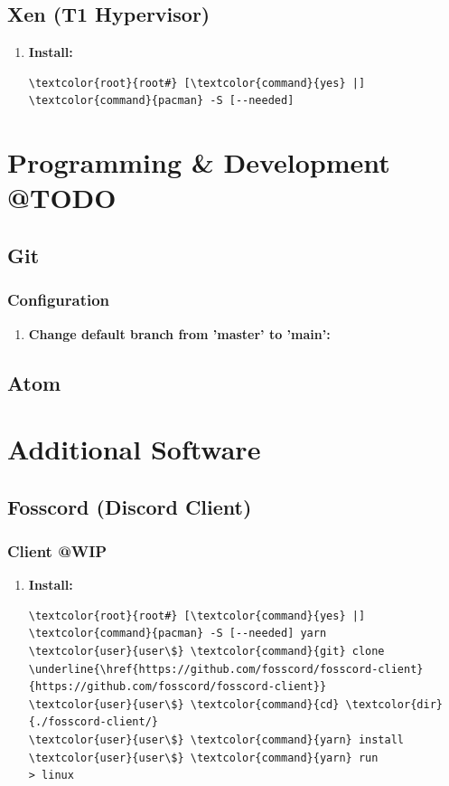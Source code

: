 \documentclass[10pt, a4paper, onecolumn, oneside, titlepage, openany]{book}
\begin{document}
\section{Xen (T1 Hypervisor)}
\begin{enumerate}
    \item \textbf{Install:}
\begin{Verbatim}[commandchars=\\\{\}]
\textcolor{root}{root#} [\textcolor{command}{yes} |] \textcolor{command}{pacman} -S [--needed] 
\end{Verbatim}
\end{enumerate}


\chapter{Programming \& Development @TODO}
\section{Git}
\subsection{Configuration}
\begin{enumerate}
    \item \textbf{Change default branch from 'master' to 'main':}
\end{enumerate}

\section{Atom}

\chapter{Additional Software}
\section{Fosscord (Discord Client)}
\subsection{Client @WIP}
\begin{enumerate}
    \item \textbf{Install:}
\begin{Verbatim}[commandchars=\\\{\}]
\textcolor{root}{root#} [\textcolor{command}{yes} |] \textcolor{command}{pacman} -S [--needed] yarn
\textcolor{user}{user\$} \textcolor{command}{git} clone \underline{\href{https://github.com/fosscord/fosscord-client}{https://github.com/fosscord/fosscord-client}}
\textcolor{user}{user\$} \textcolor{command}{cd} \textcolor{dir}{./fosscord-client/}
\textcolor{user}{user\$} \textcolor{command}{yarn} install
\textcolor{user}{user\$} \textcolor{command}{yarn} run
> linux
\end{Verbatim}        
\end{enumerate}
\end{document}
